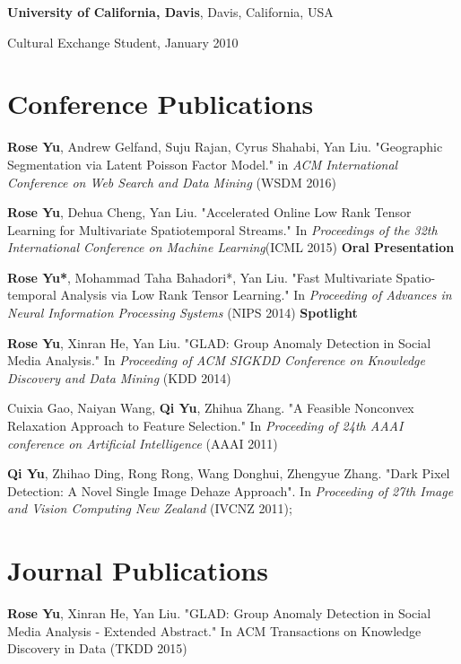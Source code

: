 \documentclass[margin,line]{res}
\newenvironment{list1}{
  \begin{list}{\ding{113}}{%
      \setlength{\itemsep}{0in}
      \setlength{\parsep}{0in} \setlength{\parskip}{0in}
      \setlength{\topsep}{0in} \setlength{\partopsep}{0in} 
      \setlength{\leftmargin}{0.17in}}}{\end{list}}
\begin{document}
\begin{resume}
{\bf University of California, Davis}, Davis, California, USA\\
\vspace*{-.1in}
\begin{list1}
\item[] Cultural Exchange Student, January 2010
\end{list1}

\section{\sc Conference Publications}

{\bf Rose Yu}, Andrew Gelfand, Suju Rajan, Cyrus Shahabi, Yan Liu. "Geographic Segmentation via Latent Poisson Factor Model." in \textit{ACM International Conference on Web Search and Data Mining} (WSDM 2016) 

{\bf Rose Yu}, Dehua Cheng, Yan Liu. "Accelerated Online Low Rank Tensor Learning for Multivariate Spatiotemporal Streams." In \textit{Proceedings  of the 32th International Conference on Machine Learning}(ICML 2015) \textbf{Oral Presentation}

{\bf Rose Yu*}, Mohammad Taha Bahadori*, Yan Liu. "Fast Multivariate Spatio-temporal Analysis via Low Rank Tensor Learning." In \textit{Proceeding of Advances in Neural Information Processing Systems} (NIPS 2014) \textbf{Spotlight}

{\bf Rose Yu}, Xinran He, Yan Liu. "GLAD: Group Anomaly Detection in Social Media Analysis." In \textit{Proceeding of ACM SIGKDD Conference on Knowledge Discovery and Data Mining} (KDD 2014)

Cuixia Gao, Naiyan Wang, {\bf Qi Yu}, Zhihua Zhang. "A Feasible Nonconvex Relaxation Approach to Feature Selection." In \textit{Proceeding of 24th AAAI conference on Artificial Intelligence} (AAAI 2011) 

{\bf Qi Yu}, Zhihao Ding, Rong Rong, Wang Donghui, Zhengyue Zhang. "Dark Pixel Detection: A Novel Single Image Dehaze Approach". In \textit{Proceeding of 27th Image and Vision Computing New Zealand }(IVCNZ 2011);  

 
\section{\sc Journal Publications}
{\bf Rose Yu}, Xinran He, Yan Liu. "GLAD: Group Anomaly Detection in Social Media Analysis - Extended Abstract." In ACM Transactions on Knowledge Discovery in Data  (TKDD 2015)



\end{resume}
\end{document}
